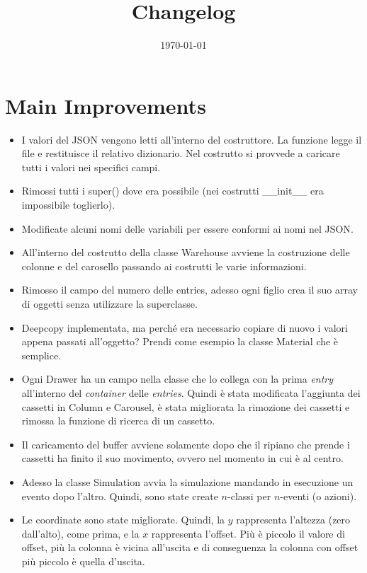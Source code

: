 \documentclass[a4paper]{article}
\begin{document}
	\title{Changelog}
	\date{\today}
	\maketitle
	
	\newpage
	
	\section*{Main Improvements}
	
	\begin{itemize}[label=]
		\item I valori del \textsf{JSON} vengono letti all'interno del costruttore. La funzione legge il file e restituisce il relativo dizionario. Nel costrutto si provvede a caricare tutti i valori nei specifici campi.
		
		\item Rimossi tutti i \textsf{super()} dove era possibile (nei costrutti \textsf{\_\_init\_\_} era impossibile toglierlo).
		
		\item Modificate alcuni nomi delle variabili per essere conformi ai nomi nel \textsf{JSON}.
		
		\item All'interno del costrutto della classe \textsf{Warehouse} avviene la costruzione delle colonne e del carosello passando ai costrutti le varie informazioni.
		
		\item Rimosso il campo del numero delle entries, adesso ogni figlio crea il suo array di oggetti senza utilizzare la superclasse.
		
		\item \textsf{Deepcopy} implementata, ma perché era necessario copiare di nuovo i valori appena passati all'oggetto? Prendi come esempio la classe \textsf{Material} che è semplice.
		
		\item Ogni \textsf{Drawer} ha un campo nella classe che lo collega con la prima \emph{entry} all'interno del \emph{container} delle \emph{entries}. Quindi è stata modificata l'aggiunta dei cassetti in \textsf{Column} e \textsf{Carousel}, è stata migliorata la rimozione dei cassetti e rimossa la funzione di ricerca di un cassetto.
		
		\item Il caricamento del \textsf{buffer} avviene solamente dopo che il ripiano che prende i cassetti ha finito il suo movimento, ovvero nel momento in cui è al centro.
		
		\item Adesso la classe \textsf{Simulation} avvia la simulazione mandando in esecuzione un evento dopo l'altro. Quindi, sono state create $n$-classi per $n$-eventi (o azioni).
		
		\item Le coordinate sono state migliorate. Quindi, la $y$ rappresenta l'altezza (zero dall'alto), come prima, e la $x$ rappresenta l'offset. Più è piccolo il valore di offset, più la colonna è vicina all'uscita e di conseguenza la colonna con offset più piccolo è quella d'uscita.
	\end{itemize}
\end{document}
